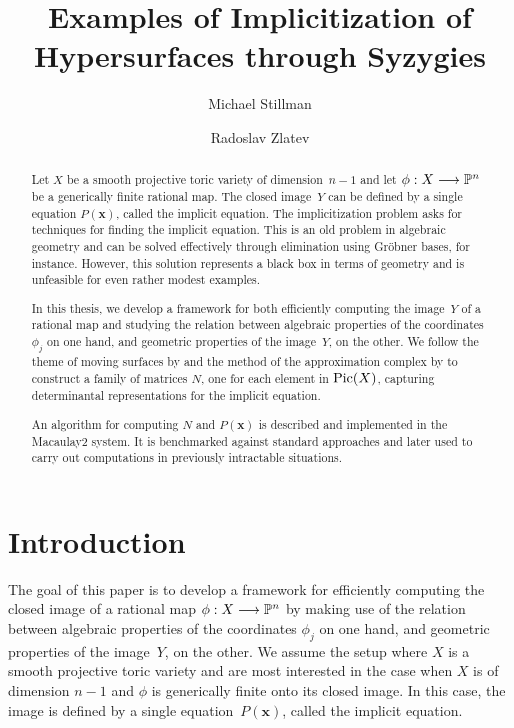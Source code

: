 \documentclass[fleqn,reqno]{amsart}
\author{Michael Stillman}
\author{Radoslav Zlatev}
\title{Examples of Implicitization of Hypersurfaces through Syzygies}
\begin{document}
\maketitle

\begin{abstract}
Let $X$ be a smooth projective toric variety of dimension~$n-1$
and let $\phi:X\longrightarrow\mathbb{P}^n$ be a generically finite rational map.
The closed image~$Y$ can be defined by a single equation $P(\mathbf x)$,
called the implicit equation.
The implicitization problem asks for techniques for finding the implicit equation.
This is an old problem in algebraic geometry and can be solved effectively
through elimination using Gr\"obner bases, for instance.
However, this solution represents
a black box in terms of geometry and is unfeasible for even rather modest examples.

In this thesis, we develop a framework for both
efficiently computing the image~$Y$ of a rational map and
studying the relation between algebraic properties of the coordinates $\phi_j$ on one hand,
and geometric properties of the image~$Y$, on the other.
We follow the theme of moving surfaces by \citet{CGZ-00} and
the method of the approximation complex by \citet{BJ-03}
to construct a family of matrices $N$, one for each element in $\operatorname{Pic}(X)$,
capturing determinantal representations for the implicit equation.

An algorithm for computing $N$ and $P(\mathbf x)$ is described and implemented in the Macaulay2 system.
It is benchmarked against standard approaches and
later used to carry out computations in previously intractable situations.
\end{abstract}





\section{Introduction}
\label{sec:intro}

\begin{paragraf*}
The goal of this paper is to develop a framework for
efficiently computing the closed image of a rational map $\phi:X\longrightarrow\mathbb{P}^n$ by
making use of the relation between algebraic properties of the coordinates $\phi_j$ on one hand,
and geometric properties of the image~$Y$, on the other.
We assume the setup where $X$ is a smooth projective toric variety
and are most interested in the case when $X$ is of dimension $n-1$ and
$\phi$ is generically finite onto its closed image.
In this case,
the image is defined by a single equation~$P(\mathbf x)$,
called the implicit equation.
\end{paragraf*}
\end{document}
